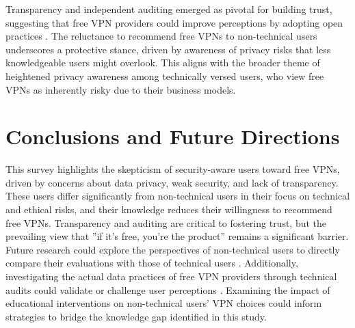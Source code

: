 \documentclass[11pt,a4paper]{article}
\begin{document}
Transparency and independent auditing emerged as pivotal for building trust, suggesting that free VPN providers could improve perceptions by adopting open practices \cite{story2021}. The reluctance to recommend free VPNs to non-technical users underscores a protective stance, driven by awareness of privacy risks that less knowledgeable users might overlook. This aligns with the broader theme of heightened privacy awareness among technically versed users, who view free VPNs as inherently risky due to their business models.


\section{Conclusions and Future Directions}

This survey highlights the skepticism of security-aware users toward free VPNs, driven by concerns about data privacy, weak security, and lack of transparency. These users differ significantly from non-technical users in their focus on technical and ethical risks, and their knowledge reduces their willingness to recommend free VPNs. Transparency and auditing are critical to fostering trust, but the prevailing view that ''if it's free, you're the product'' remains a significant barrier. \\

Future research could explore the perspectives of non-technical users to directly compare their evaluations with those of technical users \cite{moore2024}. Additionally, investigating the actual data practices of free VPN providers through technical audits could validate or challenge user perceptions \cite{fassl2023}. Examining the impact of educational interventions on non-technical users’ VPN choices could inform strategies to bridge the knowledge gap identified in this study.



\end{document}
